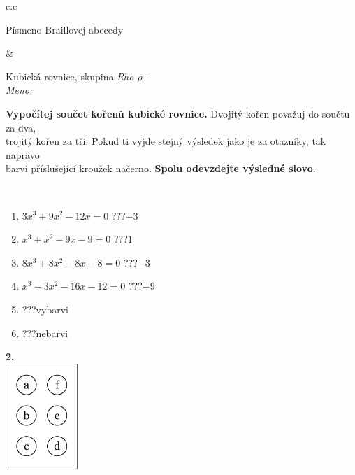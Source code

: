 \documentclass[10pt]{report}
\begin{document}
\begin{tabular}{c:c}
\begin{minipage}[c][104.5mm][t]{0.5\linewidth}
\begin{center}
\begin{minipage}{0.20\linewidth}
\begin{center}
{\small Písmeno Braillovej abecedy}
\end{center}
\end{minipage}
\end{center}
\end{minipage}
&
\begin{minipage}[c][104.5mm][t]{0.5\linewidth}
\begin{center}
\vspace{7mm}
{\huge Kubická rovnice, skupina \textit{Rho $\rho$} -}\\[5mm]
\textit{Meno:}\phantom{xxxxxxxxxxxxxxxxxxxxxxxxxxxxxxxxxxxxxxxxxxxxxxxxxxxxxxxxxxxxxxxxx}\\[5mm]
\begin{minipage}{0.95\linewidth}
\textbf{Vypočítej součet kořenů kubické rovnice.} Dvojitý kořen považuj do součtu za dva,\\trojitý kořen za tři. Pokud ti vyjde stejný výsledek jako je za otazníky, tak napravo\\barvi příslušející kroužek načerno. \textbf{Spolu odevzdejte výsledné slovo}.
\end{minipage}
\\[1mm]
\begin{minipage}{0.79\linewidth}
\begin{center}
\begin{varwidth}{\linewidth}
\begin{enumerate}
\Large
\item $3x^3+9x^2-12x=0$\quad \dotfill\; ???\;\dotfill \quad $-3$
\item $x^3+x^2-9x-9=0$\quad \dotfill\; ???\;\dotfill \quad $1$
\item $8x^3+8x^2-8x-8=0$\quad \dotfill\; ???\;\dotfill \quad $-3$
\item $x^3-3x^2-16x-12=0$\quad \dotfill\; ???\;\dotfill \quad $-9$
\item \quad \dotfill\; ???\;\dotfill \quad vybarvi
\item \quad \dotfill\; ???\;\dotfill \quad nebarvi
\end{enumerate}
\end{varwidth}
\end{center}
\end{minipage}
\begin{minipage}{0.20\linewidth}
\begin{center}
{\Huge\bfseries 2.} \\[2mm]
\includegraphics[height=40mm]{../images/braille.png}

\end{center}
\end{minipage}
\end{center}
\end{minipage}
\end{tabular}
\end{document}
